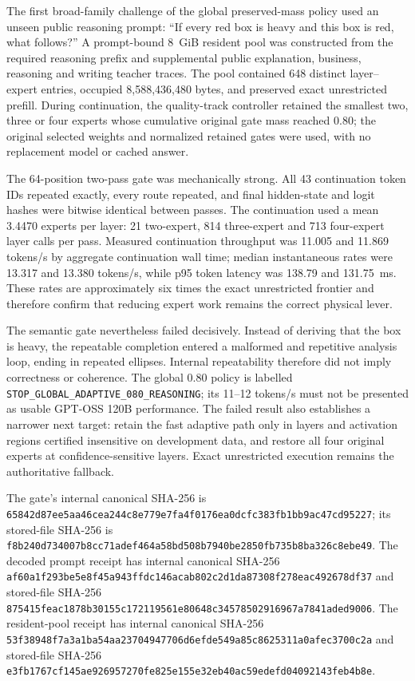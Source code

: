The first broad-family challenge of the global preserved-mass policy used an
unseen public reasoning prompt: ``If every red box is heavy and this box is
red, what follows?''  A prompt-bound 8~GiB resident pool was constructed from
the required reasoning prefix and supplemental public explanation, business,
reasoning and writing teacher traces.  The pool contained 648 distinct
layer--expert entries, occupied 8,588,436,480 bytes, and preserved exact
unrestricted prefill.  During continuation, the quality-track controller
retained the smallest two, three or four experts whose cumulative original
gate mass reached 0.80; the original selected weights and normalized retained
gates were used, with no replacement model or cached answer.

The 64-position two-pass gate was mechanically strong.  All 43 continuation
token IDs repeated exactly, every route repeated, and final hidden-state and
logit hashes were bitwise identical between passes.  The continuation used a
mean 3.4470 experts per layer: 21 two-expert, 814 three-expert and 713
four-expert layer calls per pass.  Measured continuation throughput was
11.005 and 11.869 tokens/s by aggregate continuation wall time; median
instantaneous rates were 13.317 and 13.380 tokens/s, while p95 token latency
was 138.79 and 131.75~ms.  These rates are approximately six times the exact
unrestricted frontier and therefore confirm that reducing expert work remains
the correct physical lever.

The semantic gate nevertheless failed decisively.  Instead of deriving that
the box is heavy, the repeatable completion entered a malformed and repetitive
analysis loop, ending in repeated ellipses.  Internal repeatability therefore
did not imply correctness or coherence.  The global 0.80 policy is labelled
\texttt{STOP\_GLOBAL\_ADAPTIVE\_080\_REASONING}; its 11--12 tokens/s must not
be presented as usable GPT-OSS 120B performance.  The failed result also
establishes a narrower next target: retain the fast adaptive path only in
layers and activation regions certified insensitive on development data, and
restore all four original experts at confidence-sensitive layers.  Exact
unrestricted execution remains the authoritative fallback.

The gate's internal canonical SHA-256 is
\texttt{65842d87ee5aa46cea244c8e779e7fa4f0176ea0dcfc383fb1bb9ac47cd95227};
its stored-file SHA-256 is
\texttt{f8b240d734007b8cc71adef464a58bd508b7940be2850fb735b8ba326c8ebe49}.
The decoded prompt receipt has internal canonical SHA-256
\texttt{af60a1f293be5e8f45a943ffdc146acab802c2d1da87308f278eac492678df37}
and stored-file SHA-256
\texttt{875415feac1878b30155c172119561e80648c34578502916967a7841aded9006}.
The resident-pool receipt has internal canonical SHA-256
\texttt{53f38948f7a3a1ba54aa23704947706d6efde549a85c8625311a0afec3700c2a}
and stored-file SHA-256
\texttt{e3fb1767cf145ae926957270fe825e155e32eb40ac59edefd04092143feb4b8e}.

